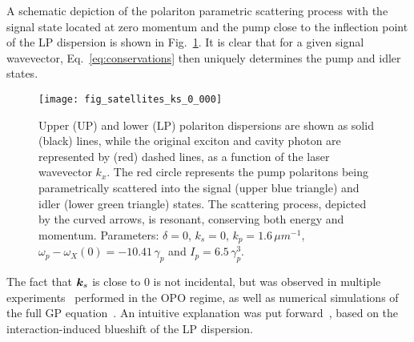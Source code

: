 A schematic depiction of the polariton parametric scattering process
with the signal state located at zero momentum and the pump close to
the inflection point of the LP dispersion is shown in
Fig.~\ref{fig:parametric-scattering}. It is clear that for a given
signal wavevector, Eq.~\eqref{eq:conservations} then uniquely
determines the pump and idler states.
%
\begin{figure}[tb]\centering
  \texttt{[image: fig\_satellites\_ks\_0\_000]}
  \caption{
    Upper (UP) and lower (LP) polariton dispersions are shown as solid
    (black) lines, while the original exciton and cavity photon are
    represented by (red) dashed lines, as a function of the laser
    wavevector $k_x$. The red circle represents the pump polaritons being
    parametrically scattered into the signal (upper blue triangle) and
    idler (lower green triangle) states. The scattering process, depicted
    by the curved arrows, is resonant, conserving both energy and
    momentum. Parameters: $\delta = 0$, $k_s = 0$, $k_p = 1.6\, \mu
    m^{-1}$, $\omega_p - \omega_X(0)= -10.41\,\gamma_p$ and $I_p =
    6.5\, \gamma_p^3$.
  }\label{fig:parametric-scattering}
\end{figure}
%
The fact that $\bm{k}_s$ is close to $0$ is not incidental, but was
observed in multiple experiments~\cite{Stevenson2000,Baumberg2000}
performed in the OPO regime, as well as numerical simulations of the
full GP equation~\cite{9783642241857}. An intuitive explanation was
put forward~\cite{Gippius2004,Whittaker_2005}, based on the
interaction-induced blueshift of the LP dispersion.

